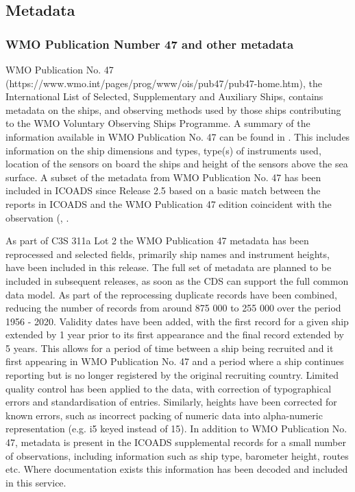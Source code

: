 \FloatBarrier
\subsection{Metadata}
\subsubsection{WMO Publication Number 47 and other metadata}
WMO Publication No. 47 (https://www.wmo.int/pages/prog/www/ois/pub47/pub47-home.htm), the International List of Selected, Supplementary and Auxiliary Ships, contains metadata on the ships, and observing methods used by those ships contributing to the WMO Voluntary Observing Ships Programme. 
A summary of the information available in WMO Publication No. 47 can be found in \cite{Kent2007}. 
This includes information on the ship dimensions and types, type(s) of instruments used, location of the sensors on board the ships and height of the sensors above the sea surface.  
A subset of the metadata from WMO Publication No. 47 has been included in ICOADS since Release 2.5 based on a basic match between the reports in ICOADS and the WMO Publication 47 edition coincident with the observation (\cite{Kent2007}, \cite{Woodruff2011}.

As part of C3S 311a Lot 2 the WMO Publication 47 metadata has been reprocessed and selected fields, primarily ship names and instrument heights, have been included in this release. 
The full set of metadata are planned to be included in subsequent releases, as soon as the CDS can support the full common data model. 
As part of the reprocessing duplicate records have been combined, reducing the number of records from around 875 000 to 255 000 over the period 1956 - 2020. 
Validity dates have been added, with the first record for a given ship extended by 1 year prior to its first appearance and the final record extended by 5 years. 
This allows for a period of time between a ship being recruited and it first appearing in WMO Publication No. 47 and a period where a ship continues reporting but is no longer registered by the original recruiting country. 
Limited quality control has been applied to the data, with correction of typographical errors and standardisation of entries. 
Similarly, heights have been corrected for known errors, such as incorrect packing of numeric data into alpha-numeric representation (e.g. i5 keyed instead of 15). 
In addition to WMO Publication No. 47, metadata is present in the ICOADS supplemental records for a small number of observations, including information such as ship type, barometer height, routes etc. 
Where documentation exists this information has been decoded and included in this service.

